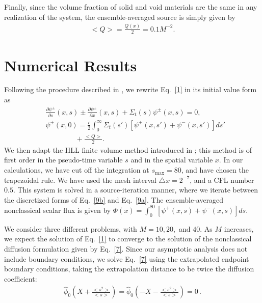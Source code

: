 \documentclass{anstrans}
\newcommand{\bl}{\big<}
\newcommand{\bg}{\big>}
\begin{document}
Finally, since the volume fraction of solid and void materials are the same in any realization of the system, the ensemble-averaged source is simply given by
\begin{align}
\bl Q\bg = \frac{Q(x)}{2} = 0.1M^{-2}.\nonumber
\end{align}


\section{Numerical Results}
Following the procedure described in \cite{vas15}, we rewrite Eq.\ \eqref{1} in its initial value form as
\begin{subequations}\label{9}
\begin{align}
&\frac{\partial\psi^{\pm}}{\partial s}(x,s) \pm \frac{\partial \psi^{\pm}}{\partial x}(x,s) + \Sigma_t(s)\psi^{\pm}(x,s)  = 0, \label{9a}\\
& \psi^{\pm}(x,0)= \frac{c}{2} \int_0^\infty \Sigma_t(s')[\psi^{+}(x,s')+\psi^{-}(x,s')]ds' \label{9b}\\
& \hspace{50pt}+ \frac{\bl Q\bg}{2}. \nonumber
\end{align}
\end{subequations}
We then adapt the HLL finite volume method introduced in \cite{kry13}; this method is of first order in the pseudo-time variable $s$ and in the spatial variable $x$. In our calculations, we have cut off the integration at $s_{\text{max}}=80$, and have chosen the trapezoidal rule. We have used the mesh interval $\triangle x=2^{-7}$, and a CFL number $0.5$. This system is solved in a source-iteration manner, where we iterate between the discretized forms of Eq.\ \eqref{9b} and Eq.\ \eqref{9a}. The ensemble-averaged nonclassical scalar flux is given by $\Phi(x) = \int_0^{80}[\psi^+(x,s)+\psi^-(x,s)]ds$.

We consider three different problems, with $M=10, 20,$ and $40$. As $M$ increases, we expect the solution of Eq.\ \eqref{1} to converge to the
solution of the nonclassical diffusion formulation given by Eq.\ \eqref{7}. Since our asymptotic analysis does not include boundary conditions, we solve Eq.\ \eqref{7} using the extrapolated endpoint boundary conditions, taking the extrapolation distance to be twice the diffusion coefficient:
\begin{align}
\hat\phi_0\left(X+\frac{\bl s^2\bg}{\bl s \bg}\right) = \hat\phi_0\left(-X-\frac{\bl s^2\bg}{\bl s\bg}\right)=0\,.\nonumber
\end{align}
\end{document}
